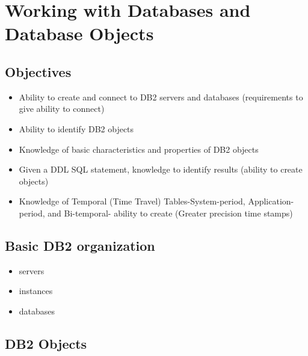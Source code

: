 \documentclass{article}
\begin{document}
\newpage

\section{Working with Databases and Database Objects}

\subsection{Objectives}
\begin{itemize}
\item Ability to create and connect to DB2 servers and databases (requirements to give ability to connect)
\item Ability to identify DB2 objects
\item Knowledge of basic characteristics and properties of DB2 objects
\item Given a DDL SQL statement, knowledge to identify results (ability to create objects)
\item Knowledge of Temporal (Time Travel) Tables-System-period, Application-period, and Bi-temporal-
ability to create (Greater precision time stamps)
\end{itemize}

\subsection{Basic DB2 organization}
\begin{itemize}
\item servers
\item instances
\item databases
\end{itemize}

\subsection{DB2 Objects}
\end{document}

